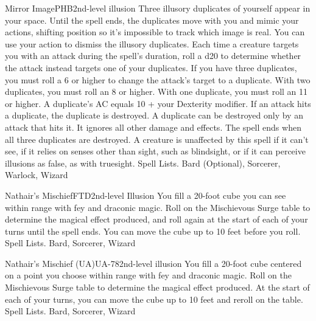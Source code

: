 \begin{spell}{Mirror Image}{PHB}{2nd-level illusion}
{
}
Three illusory duplicates of yourself appear in your space. Until the spell ends, the duplicates move with you and mimic your actions, shifting position so it’s impossible to track which image is real. You can use your action to dismiss the illusory duplicates.
Each time a creature targets you with an attack during the spell’s duration, roll a d20 to determine whether the attack instead targets one of your duplicates.
If you have three duplicates, you must roll a 6 or higher to change the attack’s target to a duplicate. With two duplicates, you must roll an 8 or higher. With one duplicate, you must roll an 11 or higher.
A duplicate’s AC equals 10 + your Dexterity modifier. If an attack hits a duplicate, the duplicate is destroyed. A duplicate can be destroyed only by an attack that hits it. It ignores all other damage and effects. The spell ends when all three duplicates are destroyed.
A creature is unaffected by this spell if it can’t see, if it relies on senses other than sight, such as blindsight, or if it can perceive illusions as false, as with truesight.
Spell Lists. Bard (Optional), Sorcerer, Warlock, Wizard
\end{spell}

\begin{spell}{Nathair's Mischief}{FTD}{2nd-level Illusion}
{
}
You fill a 20-foot cube you can see within range with fey and draconic magic. Roll on the Mischievous Surge table to determine the magical effect produced, and roll again at the start of each of your turns until the spell ends. You can move the cube up to 10 feet before you roll.
Spell Lists. Bard, Sorcerer, Wizard
\end{spell}

\begin{spell}{Nathair's Mischief (UA)}{UA-78}{2nd-level illusion}
{
}
You fill a 20-foot cube centered on a point you choose within range with fey and draconic magic. Roll on the Mischievous Surge table to determine the magical effect produced. At the start of each of your turns, you can move the cube up to 10 feet and reroll on the table.
Spell Lists. Bard, Sorcerer, Wizard
\end{spell}

